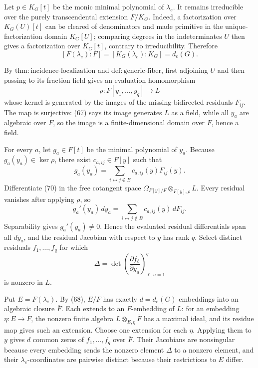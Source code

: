 Let \(p\in K_G[t]\) be the monic minimal polynomial of \(\lambda_e\).  It remains irreducible over the purely transcendental extension \(F/K_G\).  Indeed, a factorization over \(K_G(U)[t]\) can be cleared of denominators and made primitive in the unique-factorization domain \(K_G[U]\); comparing degrees in the indeterminates \(U\) then gives a factorization over \(K_G[t]\), contrary to irreducibility.  Therefore
\[
 [F(\lambda_e):F]=[K_G(\lambda_e):K_G]=d_e(G).
\tag{68}
\]

By \(\mathrm{thm:incidence\mbox{-}localization}\) and \(\mathrm{def:generic\mbox{-}fiber}\), first adjoining \(U\) and then passing to its fraction field gives an evaluation homomorphism
\[
 \rho:F[y_1,\ldots,y_q]\longrightarrow L
\tag{69}
\]
whose kernel is generated by the images of the missing-bidirected residuals \(F_{ij}\).  The map is surjective: (67) says its image generates \(L\) as a field, while all \(y_a\) are algebraic over \(F\), so the image is a finite-dimensional domain over \(F\), hence a field.

For every \(a\), let \(g_a\in F[t]\) be the minimal polynomial of \(y_a\).  Because \(g_a(y_a)\in\ker\rho\), there exist \(c_{a,ij}\in F[y]\) such that
\[
 g_a(y_a)=\sum_{i\leftrightarrow j\notin B}c_{a,ij}(y)F_{ij}(y).
\tag{70}
\]
Differentiate (70) in the free cotangent space \(\Omega_{F[y]/F}\otimes_{F[y],\rho}L\).  Every residual vanishes after applying \(\rho\), so
\[
 g_a'(y_a)\,dy_a
 =\sum_{i\leftrightarrow j\notin B}c_{a,ij}(y)\,dF_{ij}.
\tag{71}
\]
Separability gives \(g_a'(y_a)\ne0\).  Hence the evaluated residual differentials span all \(dy_a\), and the residual Jacobian with respect to \(y\) has rank \(q\).  Select distinct residuals \(f_1,\ldots,f_q\) for which
\[
 \Delta=\det\left(\frac{\partial f_\ell}{\partial y_a}\right)_{\ell,a=1}^{q}
\tag{72}
\]
is nonzero in \(L\).

Put \(E=F(\lambda_e)\).  By (68), \(E/F\) has exactly \(d=d_e(G)\) embeddings into an algebraic closure \(\overline F\).  Each extends to an \(F\)-embedding of \(L\): for an embedding \(\eta:E\to\overline F\), the nonzero finite algebra \(L\otimes_{E,\eta}\overline F\) has a maximal ideal, and its residue map gives such an extension.  Choose one extension for each \(\eta\).  Applying them to \(y\) gives \(d\) common zeros of \(f_1,\ldots,f_q\) over \(\overline F\).  Their Jacobians are nonsingular because every embedding sends the nonzero element \(\Delta\) to a nonzero element, and their \(\lambda_e\)-coordinates are pairwise distinct because their restrictions to \(E\) differ.

